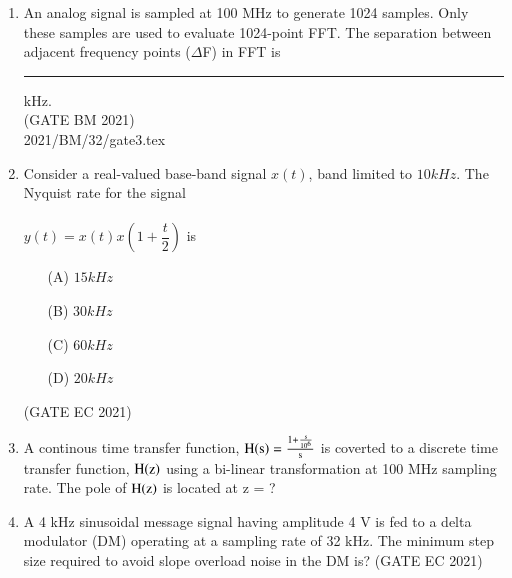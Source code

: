 \begin{enumerate}[label=\thechapter.\arabic*,ref=\thechapter.\theenumi]

\item An analog signal is sampled at 100 MHz to generate 1024 samples. Only
these samples are used to evaluate 1024-point FFT. The separation between
adjacent frequency points ($\Delta$F) in FFT is \rule{1cm}{0.5mm} kHz.\\
\hfill (GATE BM 2021)\\
\solution
 {2021/BM/32/gate3.tex}
\newpage

\item Consider a real-valued base-band signal $x(t)$, band limited to $10kHz$. The Nyquist rate for the signal \\\\
$y(t) = x(t)x(1+\dfrac{t}{2})$ is\\

\begin{enumerate}
\item[(A)] $15kHz$
\item[(B)] $30kHz$
\item[(C)] $60kHz$
\item[(D)] $20kHz$
\end{enumerate}
\hfill{(GATE EC 2021)}\\
\solution

\newpage
\item A continous time transfer function, $\text{H\ensuremath{\left(\text{s}\right)}}=\frac{1+\frac{\text{s}}{10^6}}{\text{s}}$ is coverted to a discrete time transfer function, $\text{H\ensuremath{\left(\text{z}\right)}}$ using a bi-linear transformation at 100 MHz sampling rate. The pole of $\text{H\ensuremath{\left(\text{z}\right)}}$ is located at z = ?\hfill {}\\

\solution

\newpage

\item 	A 4 kHz sinusoidal message signal having amplitude 4 V is fed to a delta modulator (DM) operating at a sampling rate of 32 kHz. The minimum step size required to avoid slope overload noise in the DM is?
\hfill{(GATE EC 2021)}
\solution

\newpage

\end{enumerate}
